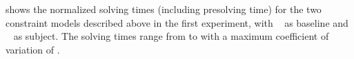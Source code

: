  shows the
normalized solving times (including \gls{presolving} time) for the two
\glspl{constraint model} described above in the first experiment, with
~ as \gls{baseline}
and ~ as
\gls{subject}.
%
The solving times range from
\printMinSolvingTime{
  \SolvTechDisableDomMatchesPrePlusSolvingTimeSpeedupAllPrePlusSolvingTimeAvgMin,
  \SolvTechDisableDomMatchesPrePlusSolvingTimeSpeedupPrePlusSolvingTimeAvgMin,
  \SolvTechDisableIllegalMatchesUncoveredOpsPrePlusSolvingTimeSpeedupPrePlusSolvingTimeAvgMin,
  \SolvTechDisableIllegalMatchesUndefinedDataPrePlusSolvingTimeSpeedupPrePlusSolvingTimeAvgMin,
  \SolvTechDisableIllegalMatchesKillsPrePlusSolvingTimeSpeedupPrePlusSolvingTimeAvgMin,
  \SolvTechDisableIllegalMatchesDefLocsPrePlusSolvingTimeSpeedupPrePlusSolvingTimeAvgMin,
  \SolvTechDisableIllegalMatchesUseLocsPrePlusSolvingTimeSpeedupPrePlusSolvingTimeAvgMin,
  \SolvTechDisableRedunKillsPrePlusSolvingTimeSpeedupPrePlusSolvingTimeAvgMin,
  \SolvTechDisableRedunNonNullCopyMatchesPrePlusSolvingTimeSpeedupPrePlusSolvingTimeAvgMin,
  \SolvTechDisableCanonicalLocsPrePlusSolvingTimeSpeedupPrePlusSolvingTimeAvgMin
} to
\printMaxSolvingTime{
  \SolvTechDisableDomMatchesPrePlusSolvingTimeSpeedupAllPrePlusSolvingTimeAvgMax,
  \SolvTechDisableDomMatchesPrePlusSolvingTimeSpeedupPrePlusSolvingTimeAvgMax,
  \SolvTechDisableIllegalMatchesUncoveredOpsPrePlusSolvingTimeSpeedupPrePlusSolvingTimeAvgMax,
  \SolvTechDisableIllegalMatchesUndefinedDataPrePlusSolvingTimeSpeedupPrePlusSolvingTimeAvgMax,
  \SolvTechDisableIllegalMatchesKillsPrePlusSolvingTimeSpeedupPrePlusSolvingTimeAvgMax,
  \SolvTechDisableIllegalMatchesDefLocsPrePlusSolvingTimeSpeedupPrePlusSolvingTimeAvgMax,
  \SolvTechDisableIllegalMatchesUseLocsPrePlusSolvingTimeSpeedupPrePlusSolvingTimeAvgMax,
  \SolvTechDisableRedunKillsPrePlusSolvingTimeSpeedupPrePlusSolvingTimeAvgMax,
  \SolvTechDisableRedunNonNullCopyMatchesPrePlusSolvingTimeSpeedupPrePlusSolvingTimeAvgMax,
  \SolvTechDisableCanonicalLocsPrePlusSolvingTimeSpeedupPrePlusSolvingTimeAvgMax
} with a maximum coefficient of variation of
\numMaxOf{
  \SolvTechDisableDomMatchesPrePlusSolvingTimeSpeedupAllPrePlusSolvingTimeCvMax,
  \SolvTechDisableDomMatchesPrePlusSolvingTimeSpeedupPrePlusSolvingTimeCvMax,
  \SolvTechDisableIllegalMatchesUncoveredOpsPrePlusSolvingTimeSpeedupPrePlusSolvingTimeCvMax,
  \SolvTechDisableIllegalMatchesUndefinedDataPrePlusSolvingTimeSpeedupPrePlusSolvingTimeCvMax,
  \SolvTechDisableIllegalMatchesKillsPrePlusSolvingTimeSpeedupPrePlusSolvingTimeCvMax,
  \SolvTechDisableIllegalMatchesDefLocsPrePlusSolvingTimeSpeedupPrePlusSolvingTimeCvMax,
  \SolvTechDisableIllegalMatchesUseLocsPrePlusSolvingTimeSpeedupPrePlusSolvingTimeCvMax,
  \SolvTechDisableRedunKillsPrePlusSolvingTimeSpeedupPrePlusSolvingTimeCvMax,
  \SolvTechDisableRedunNonNullCopyMatchesPrePlusSolvingTimeSpeedupPrePlusSolvingTimeCvMax,
  \SolvTechDisableCanonicalLocsPrePlusSolvingTimeSpeedupPrePlusSolvingTimeCvMax
}.

